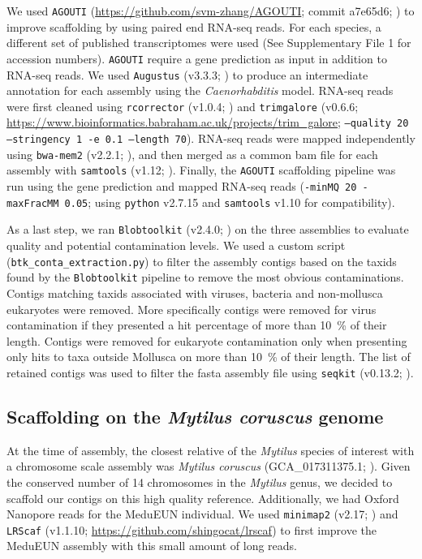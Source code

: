 \documentclass[11pt, a4paper]{article}
\begin{document}
We used \texttt{AGOUTI} (\url{https://github.com/svm-zhang/AGOUTI}; commit a7e65d6; \cite{Zhang2016a}) to improve scaffolding by using paired end RNA-seq reads.
For each species, a different set of published transcriptomes were used (See Supplementary File 1 for accession numbers).
\texttt{AGOUTI} require a gene prediction as input in addition to RNA-seq reads.
We used \texttt{Augustus} (v3.3.3; \cite{Stanke2008}) to produce an intermediate annotation for each assembly using the \textit{Caenorhabditis} model.
RNA-seq reads were first cleaned using \texttt{rcorrector} (v1.0.4; \cite{Song2015}) and \texttt{trimgalore} (v0.6.6; \url{https://www.bioinformatics.babraham.ac.uk/projects/trim_galore}; \texttt{--quality 20 \\--stringency 1 -e 0.1 --length 70}).
RNA-seq reads were mapped independently using \texttt{bwa-mem2} (v2.2.1; \cite{VasimuddinMd2019}), and then merged as a common bam file for each assembly with \texttt{samtools} (v1.12; \cite{Li2009}).
Finally, the \texttt{AGOUTI} scaffolding pipeline was run using the gene prediction and mapped RNA-seq reads (\texttt{-minMQ 20 -maxFracMM 0.05}; using \texttt{python} v2.7.15 and \texttt{samtools} v1.10 for compatibility).

As a last step, we ran \texttt{Blobtoolkit} (v2.4.0; \cite{Challis2020}) on the three assemblies to evaluate quality and potential contamination levels.
We used a custom script (\texttt{btk\_conta\_extraction.py}) to filter the assembly contigs based on the taxids found by the \texttt{Blobtoolkit} pipeline to remove the most obvious contaminations.
Contigs matching taxids associated with viruses, bacteria and non-mollusca eukaryotes were removed.
More specifically contigs were removed for virus contamination if they presented a hit percentage of more than 10~\% of their length.
Contigs were removed for eukaryote contamination only when presenting only hits to taxa outside Mollusca on more than 10~\% of their length.
The list of retained contigs was used to filter the fasta assembly file using \texttt{seqkit} (v0.13.2; \cite{Shen2016}).


\subsection{Scaffolding on the \textit{Mytilus coruscus} genome}

At the time of assembly, the closest relative of the \textit{Mytilus} species of interest with a chromosome scale assembly was \textit{Mytilus coruscus} (GCA\_017311375.1; \cite{Yang2021}).
Given the conserved number of 14 chromosomes in the \textit{Mytilus} genus, we decided to scaffold our contigs on this high quality reference.
Additionally, we had Oxford Nanopore reads for the MeduEUN individual. 
We used \texttt{minimap2} (v2.17; \cite{Li2017}) and \texttt{LRScaf} (v1.1.10; \url{https://github.com/shingocat/lrscaf}) to first improve the MeduEUN assembly with this small amount of long reads.
\end{document}

